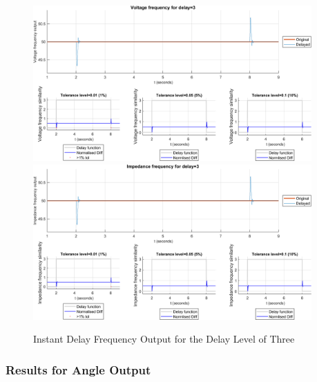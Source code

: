 \begin{figure}
    \caption{Instant Delay Frequency Output for the Delay Level of Three}
    \includegraphics[width=0.95\textwidth]{PMUsim-figures/DelayOf_3/Instant_vFrequency.png}    
    \label{fig:PMUsim_Three_vFrequency}
    \includegraphics[width=0.95\textwidth]{PMUsim-figures/DelayOf_3/Instant_iFrequency.png}    
    \label{fig:PMUsim_Three_Frequency}
        \begin{small}
     \end{small}
\end{figure}


\newpage \subsubsection{Results for Angle Output}


